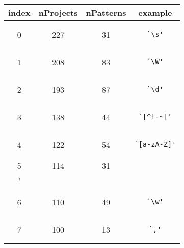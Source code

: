 \begin{center}
\begin{table}
\begin{tabular}
{cccc}
index & nProjects & nPatterns & example\\
\toprule
0 & 227 & 31 & \begin{minipage}{0.5in}\begin{verbatim}`\s'\end{verbatim}\end{minipage}\\
\midrule
1 & 208 & 83 & \begin{minipage}{0.5in}\begin{verbatim}`\W'\end{verbatim}\end{minipage}\\
\midrule
2 & 193 & 87 & \begin{minipage}{0.5in}\begin{verbatim}`\d'\end{verbatim}\end{minipage}\\
\midrule
3 & 138 & 44 & \begin{minipage}{0.5in}\begin{verbatim}`[^!-~]'\end{verbatim}\end{minipage}\\
\midrule
4 & 122 & 54 & \begin{minipage}{0.5in}\begin{verbatim}`[a-zA-Z]'\end{verbatim}\end{minipage}\\
\midrule
5 & 114 & 31 & \begin{minipage}{0.5in}\begin{verbatim}`\\'\end{verbatim}\end{minipage}\\
\midrule
6 & 110 & 49 & \begin{minipage}{0.5in}\begin{verbatim}`\w'\end{verbatim}\end{minipage}\\
\midrule
7 & 100 & 13 & \begin{minipage}{0.5in}\begin{verbatim}`,'\end{verbatim}\end{minipage}\\

\end{tabular}
\end{table}
\end{center}
